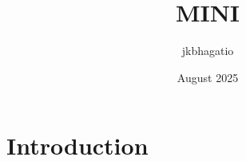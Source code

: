 \documentclass{article}
\title{MINI}
\author{jkbhagatio }
\date{August 2025}
\begin{document}
\maketitle

\section{Introduction}
\end{document}
